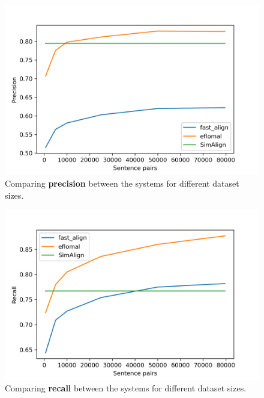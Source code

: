 \begin{figure}
\centering
\includegraphics{graphics/charts/precision.png}
\caption{Comparing \textbf{precision} between the systems for different dataset sizes.}
\label{fig:precision}
\end{figure}
\begin{figure}
\centering
\includegraphics{graphics/charts/recall.png}
\caption{Comparing \textbf{recall} between the systems for different dataset sizes.}
\label{fig:recall}
\end{figure}

